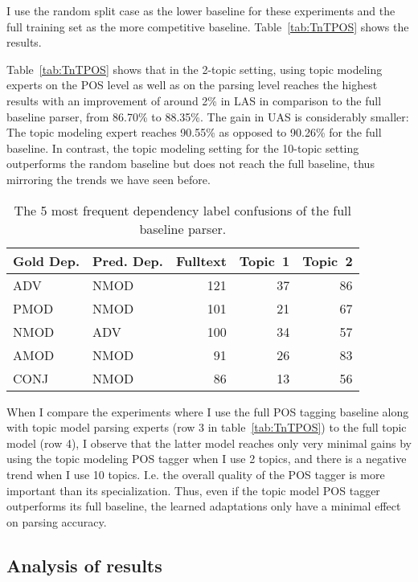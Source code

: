 I use the random split case as the lower baseline for these experiments and the full training set as the more competitive baseline. Table~\ref{tab:TnTPOS} shows the results.


Table~\ref{tab:TnTPOS}  shows that in the 2-topic setting, using topic modeling experts on the POS level as well as on the parsing level reaches the highest results with an improvement of around 2\% in LAS in comparison to the full baseline parser, from 86.70\% to 88.35\%. The gain in UAS is considerably smaller: The topic modeling expert reaches 90.55\% as opposed to 90.26\% for the full baseline. In contrast, the topic modeling setting for the 10-topic setting outperforms the random baseline but does not reach the full baseline,  thus mirroring the trends we have seen before.

\begin{table*}[t!]
\centering
\begin{tabular}{ll|rrr}

Gold Dep. & Pred. Dep. & Fulltext  &Topic~1  & Topic~2 \\ \hline
ADV & NMOD & 121 & 37 & 86\\
PMOD & NMOD & 101 & 21& 67\\
NMOD & ADV & 100 & 34 & 57 \\
AMOD & NMOD & 91 & 26 & 83\\
CONJ & NMOD & 86 & 13 & 56\\ \hline
\end{tabular}
\caption{The 5 most frequent dependency label confusions of the full baseline parser.}
\label{tab:conf:FT:TM}
\end{table*}

When I compare the experiments where I use the full POS tagging baseline along with topic model parsing experts (row 3 in table~\ref{tab:TnTPOS}) to the full topic model (row 4), I observe that the latter model reaches only very minimal gains by using the topic modeling POS tagger when I use 2 topics, and there is a negative trend when I use 10 topics. I.e. the overall quality of the POS tagger is more important than its specialization. Thus, even if the topic model POS tagger outperforms its full baseline, the learned adaptations only have a minimal effect on parsing accuracy.

\subsection{Analysis of results}

